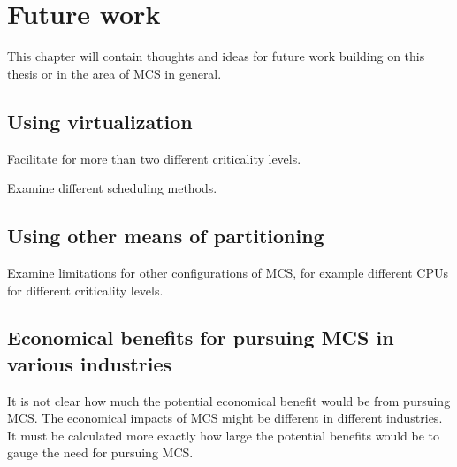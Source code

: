 \chapter{Future work}
This chapter will contain thoughts and ideas for future work building on this thesis or in the area of MCS in general.

\section{Using virtualization}
Facilitate for more than two different criticality levels.

Examine different scheduling methods. %

\section{Using other means of partitioning}
Examine limitations for other configurations of MCS, for example different CPUs for different criticality levels.

\section{Economical benefits for pursuing MCS in various industries}
It is not clear how much the potential economical benefit would be from pursuing MCS. The economical impacts of MCS might be different in different industries. It must be calculated more exactly how large the potential benefits would be to gauge the need for pursuing MCS.